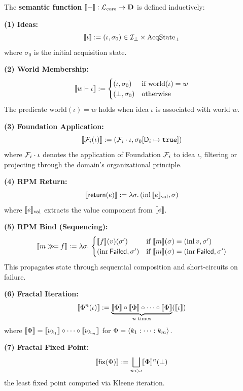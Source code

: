 \begin{definition}
\label{def:sem-valuation}
The \textbf{semantic function} $\llbracket - \rrbracket : \mathcal{L}_{\mathrm{core}} \to \mathbf{D}$
is defined inductively:

\medskip
\textbf{(1) Ideas:}
\[
\llbracket \iota \rrbracket := (\iota, \sigma_0) \in \mathcal{I}_\bot \times \mathrm{AcqState}_\bot
\]
where $\sigma_0$ is the initial acquisition state.

\medskip
\textbf{(2) World Membership:}
\[
\llbracket w \vdash \iota \rrbracket :=
\begin{cases}
(\iota, \sigma_0) & \text{if } \mathrm{world}(\iota) = w \\
(\bot, \sigma_0) & \text{otherwise}
\end{cases}
\]
The predicate $\mathrm{world}(\iota) = w$ holds when idea $\iota$ is associated with world $w$.

\medskip
\textbf{(3) Foundation Application:}
\[
\llbracket \mathcal{F}_i(\iota) \rrbracket := (\mathcal{F}_i \cdot \iota, \sigma_0[\mathsf{D}_i \mapsto \mathtt{true}])
\]
where $\mathcal{F}_i \cdot \iota$ denotes the application of Foundation $\mathcal{F}_i$
to idea $\iota$, filtering or projecting through the domain's organizational principle.

\medskip
\textbf{(4) RPM Return:}
\[
\llbracket \mathsf{return}(e) \rrbracket := \lambda \sigma.\, (\mathrm{inl}\,\llbracket e \rrbracket_{\mathrm{val}}, \sigma)
\]
where $\llbracket e \rrbracket_{\mathrm{val}}$ extracts the value component from $\llbracket e \rrbracket$.

\medskip
\textbf{(5) RPM Bind (Sequencing):}
\[
\llbracket m \mathbin{\gg\!=} f \rrbracket := \lambda \sigma.\,
\begin{cases}
\llbracket f \rrbracket(v)(\sigma') & \text{if } \llbracket m \rrbracket(\sigma) = (\mathrm{inl}\, v, \sigma') \\
(\mathrm{inr}\,\mathsf{Failed}, \sigma') & \text{if } \llbracket m \rrbracket(\sigma) = (\mathrm{inr}\,\mathsf{Failed}, \sigma')
\end{cases}
\]
This propagates state through sequential composition and short-circuits on failure.

\medskip
\textbf{(6) Fractal Iteration:}
\[
\llbracket \Phi^n(\iota) \rrbracket := \underbrace{\llbracket \Phi \rrbracket \circ \llbracket \Phi \rrbracket \circ \cdots \circ \llbracket \Phi \rrbracket}_{n \text{ times}}(\llbracket \iota \rrbracket)
\]
where $\llbracket \Phi \rrbracket = \llbracket \nu_{k_1} \rrbracket \circ \cdots \circ \llbracket \nu_{k_m} \rrbracket$ for
$\Phi = \langle k_1 : \cdots : k_m \rangle$.

\medskip
\textbf{(7) Fractal Fixed Point:}
\[
\llbracket \mathsf{fix}(\Phi) \rrbracket := \bigsqcup_{n < \omega} \llbracket \Phi \rrbracket^n(\bot)
\]
the least fixed point computed via Kleene iteration.
\end{definition}

